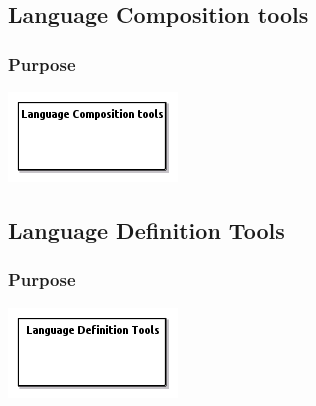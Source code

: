 \documentclass{gemoc} %
\begin{document}
\subsection{Language Composition tools}


\subsubsection{Purpose}


\begin{center}
\includegraphics*[trim=0.0cm 0.0cm 0cm 0.0cm, clip=true]{../images/generated/Generated_Language_Composition_tools.png}
\end{center}




\subsection{Language Definition Tools}


\subsubsection{Purpose}


\begin{center}
\includegraphics*[trim=0.0cm 0.0cm 0cm 0.0cm, clip=true]{../images/generated/Generated_Language_Definition_Tools.png}
\end{center}
\end{document}
